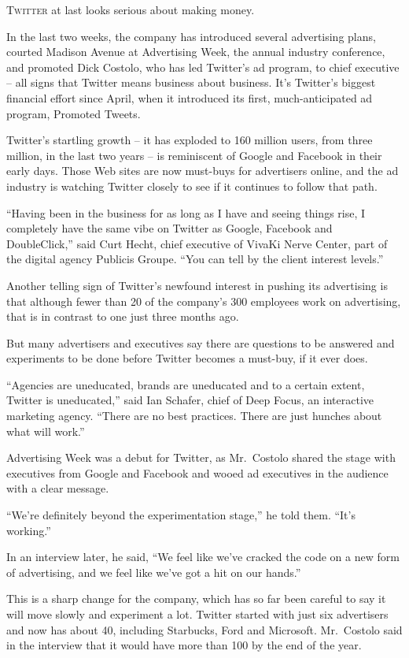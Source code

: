 ﻿\documentclass[12pt]{article}
\begin{document}
\lettrine{T}{witter} at last looks serious about making money.

In the last two weeks, the company has introduced several advertising plans, courted Madison Avenue
at Advertising Week, the annual industry conference, and promoted Dick Costolo, who has led
Twitter's ad program, to chief executive -- all signs that Twitter means business about business.
It's Twitter's biggest financial effort since April, when it introduced its first, much-anticipated
ad program, Promoted Tweets.

Twitter's startling growth -- it has exploded to 160 million users, from three million, in the last
two years -- is reminiscent of Google and Facebook in their early days. Those Web sites are now
must-buys for advertisers online, and the ad industry is watching Twitter closely to see if it
continues to follow that path.

``Having been in the business for as long as I have and seeing things rise, I completely have the
same vibe on Twitter as Google, Facebook and DoubleClick,'' said Curt Hecht, chief executive of
VivaKi Nerve Center, part of the digital agency Publicis Groupe. ``You can tell by the client
interest levels.''

Another telling sign of Twitter's newfound interest in pushing its advertising is that although
fewer than 20 of the company's 300 employees work on advertising, that is in contrast to one just
three months ago.

But many advertisers and executives say there are questions to be answered and experiments to be
done before Twitter becomes a must-buy, if it ever does.

``Agencies are uneducated, brands are uneducated and to a certain extent, Twitter is uneducated,''
said Ian Schafer, chief of Deep Focus, an interactive marketing agency. ``There are no best
practices. There are just hunches about what will work.''

Advertising Week was a debut for Twitter, as Mr.~Costolo shared the stage with executives from
Google and Facebook and wooed ad executives in the audience with a clear message.

``We're definitely beyond the experimentation stage,'' he told them. ``It's working.''

In an interview later, he said, ``We feel like we've cracked the code on a new form of advertising,
and we feel like we've got a hit on our hands.''

This is a sharp change for the company, which has so far been careful to say it will move slowly and
experiment a lot. Twitter started with just six advertisers and now has about 40, including
Starbucks, Ford and Microsoft. Mr.~Costolo said in the interview that it would have more than 100 by
the end of the year.
\end{document}
